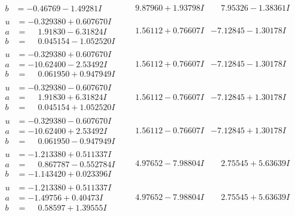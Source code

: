 \documentclass[1p]{elsarticle_modified}
\theoremstyle{definition}
\begin{document}
$$\begin{array}{c|c|c}
\begin{aligned}
b &= -0.46769 - 1.49281 I\end{aligned}
 & \phantom{-}9.87960 + 1.93798 I & \phantom{-}7.95326 - 1.38361 I \\ \hline\begin{aligned}
u &= -0.329380 + 0.607670 I \\
a &= \phantom{-}1.91830 - 6.31824 I \\
b &= \phantom{-}0.045154 - 1.052520 I\end{aligned}
 & \phantom{-}1.56112 + 0.76607 I & -7.12845 - 1.30178 I \\ \hline\begin{aligned}
u &= -0.329380 + 0.607670 I \\
a &= -10.62400 - 2.53492 I \\
b &= \phantom{-}0.061950 + 0.947949 I\end{aligned}
 & \phantom{-}1.56112 + 0.76607 I & -7.12845 - 1.30178 I \\ \hline\begin{aligned}
u &= -0.329380 - 0.607670 I \\
a &= \phantom{-}1.91830 + 6.31824 I \\
b &= \phantom{-}0.045154 + 1.052520 I\end{aligned}
 & \phantom{-}1.56112 - 0.76607 I & -7.12845 + 1.30178 I \\ \hline\begin{aligned}
u &= -0.329380 - 0.607670 I \\
a &= -10.62400 + 2.53492 I \\
b &= \phantom{-}0.061950 - 0.947949 I\end{aligned}
 & \phantom{-}1.56112 - 0.76607 I & -7.12845 + 1.30178 I \\ \hline\begin{aligned}
u &= -1.213380 + 0.511337 I \\
a &= \phantom{-}0.867787 - 0.552784 I \\
b &= -1.143420 + 0.023396 I\end{aligned}
 & \phantom{-}4.97652 - 7.98804 I & \phantom{-}2.75545 + 5.63639 I \\ \hline\begin{aligned}
u &= -1.213380 + 0.511337 I \\
a &= -1.49756 + 0.40473 I \\
b &= \phantom{-}0.58597 + 1.39555 I\end{aligned}
 & \phantom{-}4.97652 - 7.98804 I & \phantom{-}2.75545 + 5.63639 I \\ \hline\begin{aligned}

\end{aligned}
\end{array}$$
\end{document}
